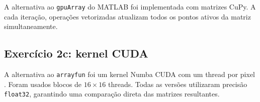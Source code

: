 A alternativa ao \texttt{gpuArray} do MATLAB foi implementada com matrizes
CuPy. A cada iteração, operações vetorizadas atualizam todos os pontos ativos
da matriz simultaneamente.

\subsection{Exercício 2c: kernel CUDA}

A alternativa ao \texttt{arrayfun} foi um kernel Numba CUDA com um thread por
pixel \autocite{numba}. Foram usados blocos de $16\times16$ threads. Todas as
versões utilizaram precisão \texttt{float32}, garantindo uma comparação
direta das matrizes resultantes.
